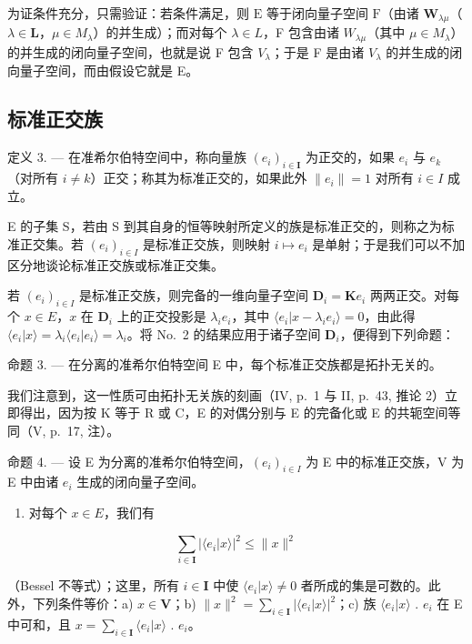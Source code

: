 为证条件充分，只需验证：若条件满足，则 \(\mathrm{E}\) 等于闭向量子空间 \(\mathrm{F}\)（由诸 \(\mathbf{W}_{\lambda \mu}\)（\(\lambda \in \mathbf{L}\)，\(\mu\in M_{\lambda}\)）的并生成）；而对每个 \(\lambda\in L\)，F 包含由诸 \(W_{\lambda\mu}\)（其中 \(\mu\in M_{\lambda}\)）的并生成的闭向量子空间，也就是说 F 包含 \(V_{\lambda}\)；于是 F 是由诸 \(V_{\lambda}\) 的并生成的闭向量子空间，而由假设它就是 E。

\subsection{标准正交族}

定义 3. --- 在准希尔伯特空间中，称向量族 \((e_{i})_{i\in\mathbf{I}}\) 为正交的，如果 \(e_{i}\) 与 \(e_{k}\)（对所有 \(i\neq k\)）正交；称其为标准正交的，如果此外 \(\|e_{i}\|=1\) 对所有 \(i\in I\) 成立。

E 的子集 S，若由 S 到其自身的恒等映射所定义的族是标准正交的，则称之为标准正交集。若 \((e_{i})_{i\in I}\) 是标准正交族，则映射 \(i\mapsto e_{i}\) 是单射；于是我们可以不加区分地谈论标准正交族或标准正交集。

若 \((e_i)_{i\in I}\) 是标准正交族，则完备的一维向量子空间 \(\mathbf{D}_i = \mathbf{K}e_i\) 两两正交。对每个 \(x\in E\)，\(x\) 在 \(\mathbf{D}_i\) 上的正交投影是 \(\lambda_i e_i\)，其中 \(\langle e_i|x - \lambda_i e_i\rangle = 0\)，由此得 \(\langle e_i|x\rangle = \lambda_i\langle e_i|e_i\rangle = \lambda_i\)。将 No.~2 的结果应用于诸子空间 \(\mathbf{D}_i\)，便得到下列命题：

命题 3. --- 在分离的准希尔伯特空间 E 中，每个标准正交族都是拓扑无关的。

我们注意到，这一性质可由拓扑无关族的刻画（IV, p.~1 与 II, p.~43, 推论 2）立即得出，因为按 K 等于 R 或 C，E 的对偶分别与 E 的完备化或 E 的共轭空间等同（V, p.~17, 注）。

命题 4. --- 设 E 为分离的准希尔伯特空间，\((e_{i})_{i\in I}\) 为 E 中的标准正交族，V 为 E 中由诸 \(e_{i}\) 生成的闭向量子空间。

\begin{enumerate}
\def\labelenumi{\arabic{enumi})}
\tightlist
\item
  对每个 \(x \in E\)，我们有
\end{enumerate}

\[
\sum_ {i \in \mathbf {I}} \left| \langle e _ {i} | x \rangle \right| ^ {2} \leqslant \| x \| ^ {2}\tag{1}
\]

（Bessel 不等式）；这里，所有 \(i \in \mathbf{I}\) 中使 \(\langle e_i|x\rangle \neq 0\) 者所成的集是可数的。此外，下列条件等价：a) \(x \in \mathbf{V}\)；b) \(\|x\|^2 = \sum_{i \in \mathbf{I}} |\langle e_i|x\rangle|^2\)；c) 族 \(\langle e_i|x\rangle\) . \(e_i\) 在 E 中可和，且 \(x = \sum_{i \in \mathbf{I}} \langle e_i|x\rangle\) . \(e_i\)。

